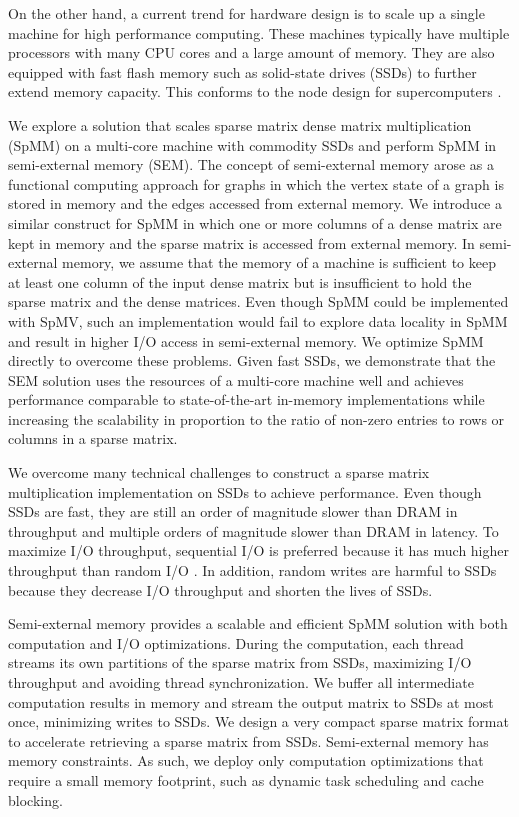 
On the other hand, a current trend for hardware design is to scale up
a single machine for high performance computing.
These machines typically have multiple processors with many CPU cores and
a large amount of memory. They are also equipped with fast flash
memory such as solid-state drives (SSDs) to further extend memory capacity.
This conforms to the node design for supercomputers \cite{Ang14}.

We explore a solution that scales sparse matrix dense matrix multiplication
(SpMM) on a multi-core machine with commodity SSDs and
perform SpMM in semi-external memory (SEM). The concept of semi-external memory
arose as a functional computing approach for graphs \cite{Abello98} in which
the vertex state of a graph is stored in memory and the edges accessed from
external memory. We introduce a similar construct for SpMM in which one or more
columns of a dense matrix are kept in memory and the sparse matrix is accessed
from external memory. In semi-external memory, we assume
that the memory of a machine is sufficient to keep at least one column
of the input dense matrix but is insufficient to hold the sparse matrix
and the dense matrices. Even though SpMM could be implemented with
SpMV, such an implementation would fail to explore data locality in SpMM and
result in higher I/O access in semi-external memory. We optimize SpMM directly
to overcome these problems. Given fast SSDs, we demonstrate that the SEM
solution uses the resources of a multi-core machine well and
achieves performance comparable to state-of-the-art in-memory implementations
while increasing the scalability in proportion
to the ratio of non-zero entries to rows or columns in a sparse matrix.


We overcome many technical challenges to construct a sparse matrix
multiplication implementation on SSDs to achieve performance. Even though SSDs
are fast, they are still an order of magnitude slower than DRAM in throughput
and multiple orders of magnitude slower than DRAM in latency.
To maximize I/O throughput, sequential I/O is preferred because it has much
higher throughput than random I/O \cite{safs}. In addition, random writes are
harmful to SSDs \cite{sfs} because
they decrease I/O throughput and shorten the lives of SSDs.

Semi-external memory provides a scalable and efficient SpMM solution with
both computation and I/O optimizations. During the computation, each
thread streams its own partitions of the sparse matrix from SSDs, maximizing
I/O throughput and avoiding thread synchronization. We buffer all
intermediate computation results in memory and stream the output matrix to SSDs
at most once, minimizing writes to SSDs. We design a very compact sparse matrix
format to accelerate retrieving a sparse matrix from SSDs.
Semi-external memory has memory constraints. As such, we deploy
only computation optimizations that require a small memory footprint, such as
dynamic task scheduling and cache blocking.

